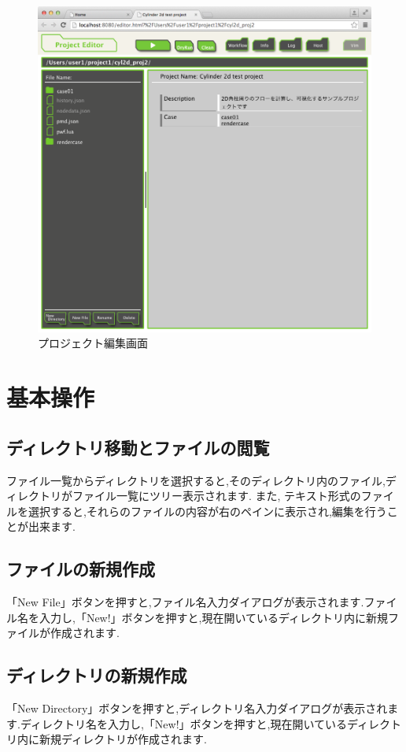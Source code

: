 \documentclass[a4paper,10pt,oneside]{jsbook}
\begin{document}
\begin{figure}[H]
	\begin{center}
		\includegraphics[width=12.0cm]{image/projeditor_000.png}
	\end{center}
	\caption{プロジェクト編集画面}
	\label{fig:projeditor}
\end{figure}

\newpage

\section{基本操作}

\subsection{ディレクトリ移動とファイルの閲覧}
ファイル一覧からディレクトリを選択すると,そのディレクトリ内のファイル,ディレクトリがファイル一覧にツリー表示されます. また, テキスト形式のファイルを選択すると,それらのファイルの内容が右のペインに表示され,編集を行うことが出来ます.

\subsection{ファイルの新規作成}
「New File」ボタンを押すと,ファイル名入力ダイアログが表示されます.ファイル名を入力し,「New!」ボタンを押すと,現在開いているディレクトリ内に新規ファイルが作成されます.

\subsection{ディレクトリの新規作成}
「New Directory」ボタンを押すと,ディレクトリ名入力ダイアログが表示されます.ディレクトリ名を入力し,「New!」ボタンを押すと,現在開いているディレクトリ内に新規ディレクトリが作成されます.
\end{document}
